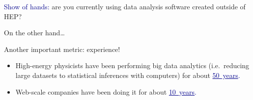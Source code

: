 \documentclass[aspectratio=169]{beamer}
\begin{document}
\begin{frame}{}
\huge
\vspace{0.5 cm}
\begin{center}
\textcolor{darkblue}{Show of hands:} are you currently using data analysis software created outside of HEP?

\vspace{1 cm}
\end{center}
\end{frame}

\begin{frame}{}
\huge
\vspace{0.5 cm}
\begin{center}
On the other hand\ldots
\end{center}
\end{frame}

\begin{frame}{Another important metric: experience!}
\Large
\vspace{0.25 cm}
\begin{itemize}
\item High-energy physicists have been performing big data analytics (i.e.\ reducing large datasets to statistical inferences with computers) for about \textcolor{darkblue}{\underline{50~years}.}
\item<2-> Web-scale companies have been doing it for about \textcolor{darkblue}{\underline{10~years}.}
\end{itemize}

\vspace{0.5 cm}

\vspace{0.5 cm}

\vspace{0.2 cm}
\end{frame}
\end{document}
